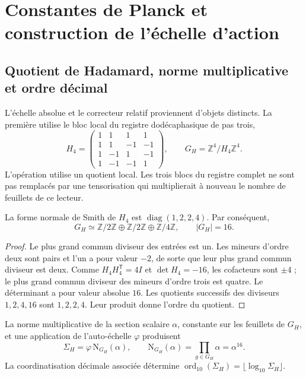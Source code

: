 \section{Constantes de Planck et construction de l’échelle d’action}
\label{sec:action}
\subsection{Quotient de Hadamard, norme multiplicative et ordre décimal}

L'échelle absolue et le correcteur relatif proviennent d'objets
distincts. La première utilise le bloc local du registre dodécaphasique
de pas trois,
\begin{equation}
 H_4=\begin{pmatrix}
 1&1&1&1\\1&1&-1&-1\\1&-1&1&-1\\1&-1&-1&1
 \end{pmatrix},\qquad
 G_H=\mathbb Z^4/H_4\mathbb Z^4.
 \label{eq:el-h4}
\end{equation}
L'opération utilise un quotient local. Les trois blocs du registre
complet ne sont pas remplacés par une tensorisation qui multiplierait à
nouveau le nombre de feuillets de ce lecteur.

\begin{lemma}
La forme normale de Smith de \(H_4\) est
\(\operatorname{diag}(1,2,2,4)\). Par conséquent,
\[
 G_H\simeq\mathbb Z/2\mathbb Z\oplus\mathbb Z/2\mathbb Z
 \oplus\mathbb Z/4\mathbb Z,\qquad |G_H|=16.
\]
\end{lemma}
\begin{proof}
Le plus grand commun diviseur des entrées est un. Les mineurs d’ordre deux
sont pairs et l’un a pour valeur \(-2\), de sorte que leur plus grand commun diviseur
est deux. Comme \(H_4H_4^{\mathsf T}=4I\) et \(\det H_4=-16\), les
cofacteurs sont \(\pm4\) ; le plus grand commun diviseur des mineurs d’ordre
trois est quatre. Le déterminant a pour valeur absolue \(16\). Les quotients successifs des diviseurs
\(1,2,4,16\) sont \(1,2,2,4\). Leur produit donne l’ordre du quotient.
\end{proof}

\begin{definition}
La norme multiplicative de la section scalaire \(\alpha\), constante
sur les feuillets de \(G_H\), et une application de l'auto-échelle
\(\varphi\) produisent
\begin{equation}
 \Sigma_H=\varphi\,\mathrm N_{G_H}(\alpha),\qquad
 \mathrm N_{G_H}(\alpha)=\prod_{g\in G_H}\alpha=\alpha^{16}.
 \label{eq:el-lector-determinantal}
\end{equation}
La coordinatisation décimale associée détermine
\(\operatorname{ord}_{10}(\Sigma_H)=\lfloor\log_{10}\Sigma_H\rfloor\).
\end{definition}

